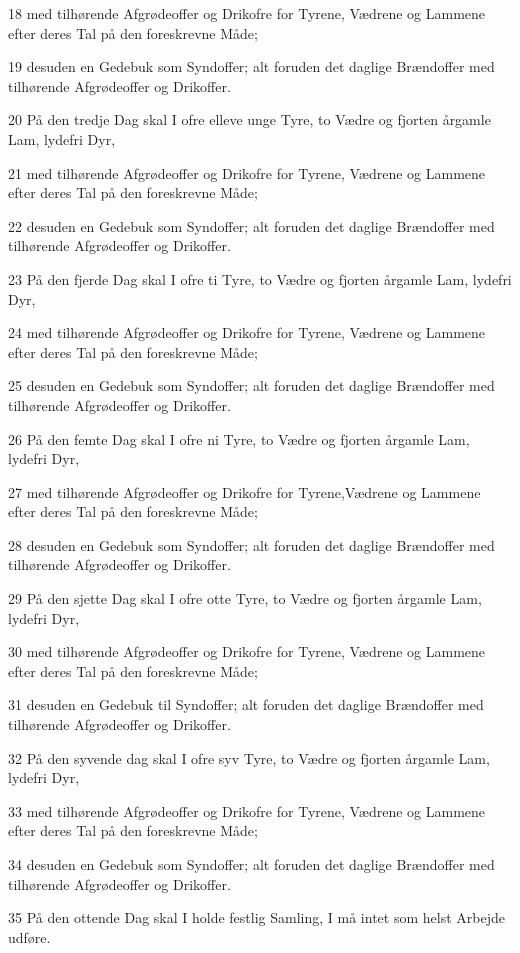 \par 18 med tilhørende Afgrødeoffer og Drikofre for Tyrene, Vædrene og Lammene efter deres Tal på den foreskrevne Måde;
\par 19 desuden en Gedebuk som Syndoffer; alt foruden det daglige Brændoffer med tilhørende Afgrødeoffer og Drikoffer.
\par 20 På den tredje Dag skal I ofre elleve unge Tyre, to Vædre og fjorten årgamle Lam, lydefri Dyr,
\par 21 med tilhørende Afgrødeoffer og Drikofre for Tyrene, Vædrene og Lammene efter deres Tal på den foreskrevne Måde;
\par 22 desuden en Gedebuk som Syndoffer; alt foruden det daglige Brændoffer med tilhørende Afgrødeoffer og Drikoffer.
\par 23 På den fjerde Dag skal I ofre ti Tyre, to Vædre og fjorten årgamle Lam, lydefri Dyr,
\par 24 med tilhørende Afgrødeoffer og Drikofre for Tyrene, Vædrene og Lammene efter deres Tal på den foreskrevne Måde;
\par 25 desuden en Gedebuk som Syndoffer; alt foruden det daglige Brændoffer med tilhørende Afgrødeoffer og Drikoffer.
\par 26 På den femte Dag skal I ofre ni Tyre, to Vædre og fjorten årgamle Lam, lydefri Dyr,
\par 27 med tilhørende Afgrødeoffer og Drikofre for Tyrene,Vædrene og Lammene efter deres Tal på den foreskrevne Måde;
\par 28 desuden en Gedebuk som Syndoffer; alt foruden det daglige Brændoffer med tilhørende Afgrødeoffer og Drikoffer.
\par 29 På den sjette Dag skal I ofre otte Tyre, to Vædre og fjorten årgamle Lam, lydefri Dyr,
\par 30 med tilhørende Afgrødeoffer og Drikofre for Tyrene, Vædrene og Lammene efter deres Tal på den foreskrevne Måde;
\par 31 desuden en Gedebuk til Syndoffer; alt foruden det daglige Brændoffer med tilhørende Afgrødeoffer og Drikoffer.
\par 32 På den syvende dag skal I ofre syv Tyre, to Vædre og fjorten årgamle Lam, lydefri Dyr,
\par 33 med tilhørende Afgrødeoffer og Drikofre for Tyrene, Vædrene og Lammene efter deres Tal på den foreskrevne Måde;
\par 34 desuden en Gedebuk som Syndoffer; alt foruden det daglige Brændoffer med tilhørende Afgrødeoffer og Drikoffer.
\par 35 På den ottende Dag skal I holde festlig Samling, I må intet som helst Arbejde udføre.
